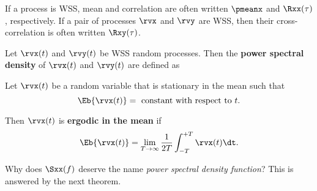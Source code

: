 If a process is WSS, mean and correlation are often written
$\pmeanx$ and $\Rxx(\tau)$, respectively.
If a pair of processes $\rvx$ and $\rvy$ are WSS,
then their cross-correlation is often written $\Rxy(\tau)$.

\begin{definition}
\label{def:psd}
Let $\rvx(t)$ and $\rvy(t)$ be WSS random processes.
Then the \textbf{power spectral density} of $\rvx(t)$ and $\rvy(t)$ are defined as
\end{definition}


\begin{definition}
Let $\rvx(t)$ be a random variable that is stationary in the mean such that
\[ \Eb{\rvx(t)} = \mbox{ constant with respect to } t.\]

Then $\rvx(t)$ is \textbf{ergodic in the mean} if
\[ \Eb{\rvx(t)} = \lim_{T\to\infty}\frac{1}{2T}\int_{-T}^{+T}\rvx(t)\dt.\]
\end{definition}

Why does $\Sxx(f)$ deserve the name {\em power spectral density function}?
This is answered by the next theorem.

